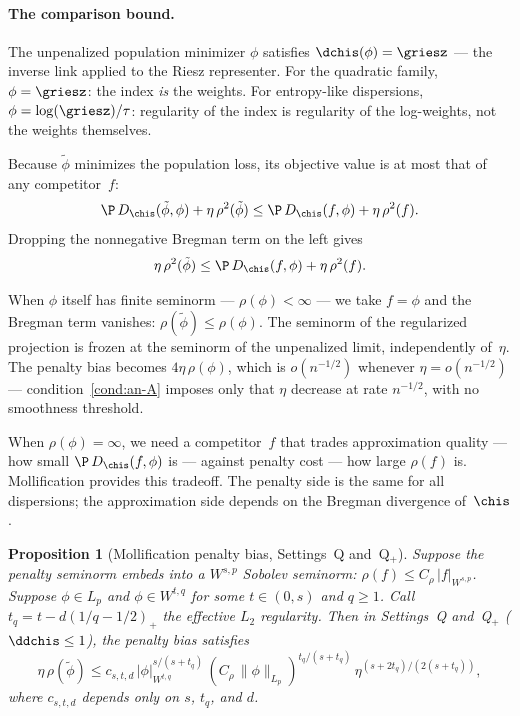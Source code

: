 \documentclass{article}
\newtheorem{proposition}[theorem]{Proposition}
\begin{document}
\paragraph{The comparison bound.}
The unpenalized population minimizer
$\phi$ satisfies
$\dchis(\phi) = \griesz$
--- the inverse link applied
to the Riesz representer.
For the quadratic family,
$\phi = \griesz$:
the index \emph{is} the weights.
For entropy-like dispersions,
$\phi = \log(\griesz)/\tau$:
regularity of the index is regularity
of the log-weights,
not the weights themselves.

Because $\tilde\phi$ minimizes
the population loss,
its objective value is at most
that of any competitor~$f$:
\[
\P\,D_{\chis}(\tilde\phi, \phi)
  + \eta\,\rho^2(\tilde\phi)
  \le \P\,D_{\chis}(f, \phi)
  + \eta\,\rho^2(f).
\]
Dropping the nonnegative
Bregman term on the left
gives
\begin{equation}
\label{eq:comparison-bound}
\eta\,\rho^2(\tilde\phi)
  \le \P\,D_{\chis}(f, \phi)
  + \eta\,\rho^2(f).
\end{equation}

When $\phi$ itself has finite seminorm
--- $\rho(\phi) < \infty$ ---
we take $f = \phi$
and the Bregman term vanishes:
$\rho(\tilde\phi) \le \rho(\phi)$.
The seminorm of the regularized projection
is frozen at the seminorm
of the unpenalized limit,
independently of~$\eta$.
The penalty bias becomes
$4\eta\,\rho(\phi)$,
which is $o(n^{-1/2})$
whenever $\eta = o(n^{-1/2})$
--- condition~\ref{cond:an-A} imposes only
that $\eta$ decrease
at rate $n^{-1/2}$,
with no smoothness threshold.

When $\rho(\phi) = \infty$,
we need a competitor~$f$
that trades approximation quality
--- how small $\P\,D_{\chis}(f, \phi)$ is ---
against penalty cost
--- how large $\rho(f)$ is.
Mollification provides this tradeoff.
The penalty side is the same
for all dispersions;
the approximation side depends on
the Bregman divergence of~$\chis$.

\begin{proposition}[Mollification penalty bias, Settings~Q and~Q$_+$]
\label{prop:penalty-bias-Q}
Suppose the penalty seminorm embeds
into a $W^{s,p}$ Sobolev seminorm:
$\rho(f) \le C_\rho\,|f|_{W^{s,p}}$.
Suppose $\phi \in L_p$ and
$\phi \in W^{t,q}$
for some $t \in (0, s)$ and $q \ge 1$.
Call $t_q = t - d(1/q - 1/2)_+$
the effective $L_2$ regularity.
Then in Settings~Q and~Q$_+$
($\ddchis \le 1$),
the penalty bias satisfies
\begin{equation}
\label{eq:mollification-penalty-bias}
\eta\,\rho(\tilde\phi)
  \le c_{s,t,d}\,
  |\phi|_{W^{t,q}}^{s/(s+t_q)}\,
  (C_\rho\,\|\phi\|_{L_p})^{t_q/(s+t_q)}\,
  \eta^{(s + 2t_q)/(2(s + t_q))},
\end{equation}
where $c_{s,t,d}$ depends only on $s$, $t_q$, and $d$.
\end{proposition}
\end{document}
